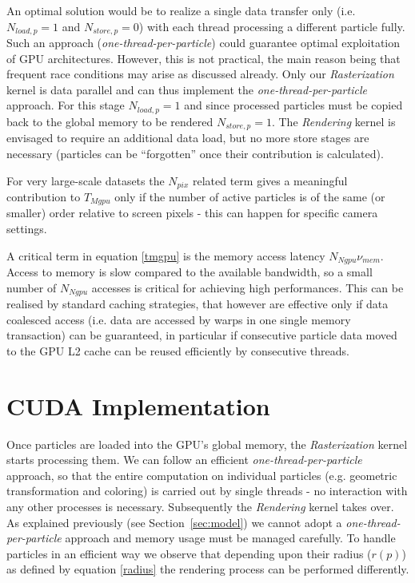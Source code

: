 \documentclass[1p]{elsarticle}
\begin{document}
An optimal solution would be to realize a single data transfer only
(i.e. $N_{load,p} = 1$ and $N_{store,p} = 0$) with each thread processing a different particle fully. Such an approach ({\it one-thread-per-particle}) could guarantee optimal exploitation of GPU architectures. However,
 this is not practical, the main reason being that frequent race conditions may arise as discussed already.
Only our {\it Rasterization} kernel is data parallel and can thus implement the {\it one-thread-per-particle} approach. For this stage $N_{load,p} = 1$ and since processed particles must be copied back to the global memory to be rendered $N_{store,p} = 1$. The {\it Rendering} kernel is envisaged to require an additional data load, but no more store 
stages are necessary (particles can be ``forgotten'' once their contribution is calculated).

For very large-scale datasets the $N_{pix}$ related term gives a meaningful contribution to $T_{Mgpu}$ only if the number of active particles is of the same (or smaller) order relative to screen pixels - this can happen for specific camera settings. 

A critical term in equation \eqref{tmgpu} is the memory access
latency $N_{Ngpu} \nu_{mem}$. Access to memory is slow compared to
the available bandwidth, so a small number of $N_{Ngpu}$ accesses is critical for achieving high performances. This can be realised by standard caching strategies, that
however are effective only if data coalesced access (i.e. data are accessed by warps in one single memory transaction) can be guaranteed, in particular if consecutive particle data moved to the GPU L2 cache can be reused efficiently by consecutive threads. 

\section{CUDA Implementation}
\label{sec:implementation}

Once particles are loaded into the GPU's global memory, the {\it Rasterization} kernel starts processing them. We can follow an efficient {\it one-thread-per-particle} approach, so that the entire computation on individual particles (e.g. geometric transformation and coloring) is carried out by single threads - no interaction with any other processes is necessary. 
Subsequently the {\it Rendering} kernel takes over. As explained previously (see Section~\ref{sec:model}) we cannot adopt a {\it one-thread-per-particle} approach and memory usage must be managed carefully. To handle particles in an efficient way we observe that depending upon their radius ($r(p)$) as defined by equation \eqref{radius} the rendering process can be performed differently.
\end{document}
